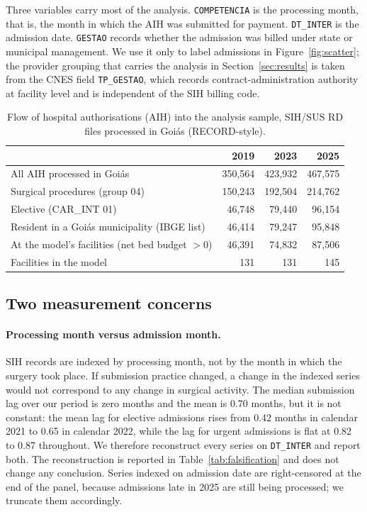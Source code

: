 Three variables carry most of the analysis. \texttt{COMPETENCIA} is the
processing month, that is, the month in which the AIH was submitted for
payment. \texttt{DT\_INTER} is the admission date. \texttt{GESTAO} records
whether the admission was billed under state or municipal management.
We use it only to
label admissions in Figure~\ref{fig:scatter}; the provider grouping that carries
the analysis in Section~\ref{sec:results} is taken from the CNES field
\texttt{TP\_GESTAO}, which records contract-administration authority at facility
level and is independent of the SIH billing code.


\begin{table}[t]
\centering
\caption{Flow of hospital authorisations (AIH) into the analysis sample, SIH/SUS RD files processed in Goi\'as (RECORD-style).}
\label{tab:recordflow}
\begin{tabular}{lrrr}
\toprule
 & 2019 & 2023 & 2025 \\
\midrule
All AIH processed in Goi\'as & 350{,}564 & 423{,}932 & 467{,}575 \\
Surgical procedures (group 04) & 150{,}243 & 192{,}504 & 214{,}762 \\
Elective (CAR\_INT 01) & 46{,}748 & 79{,}440 & 96{,}154 \\
Resident in a Goi\'as municipality (IBGE list) & 46{,}414 & 79{,}247 & 95{,}848 \\
At the model's facilities (net bed budget $> 0$) & 46{,}391 & 74{,}832 & 87{,}506 \\
Facilities in the model & 131 & 131 & 145 \\
\bottomrule
\end{tabular}
\end{table}

\subsection{Two measurement concerns}
\label{sec:measconc}

\paragraph{Processing month versus admission month.}
SIH records are indexed by processing month, not by the month in which the
surgery took place. If submission practice changed, a change in the indexed
series would not correspond to any change in surgical activity. The median
submission lag over our period is zero months and the mean is 0.70 months, but
it is not constant: the mean lag for elective admissions rises from 0.42 months
in calendar 2021 to 0.65 in calendar 2022, while the lag for urgent admissions is flat at 0.82 to
0.87 throughout. We therefore reconstruct every series on \texttt{DT\_INTER}
and report both. The reconstruction is reported in Table~\ref{tab:falsification}
and does not change any conclusion. Series indexed on admission date are
right-censored at the end of the panel, because admissions late in 2025 are
still being processed; we truncate them accordingly.

